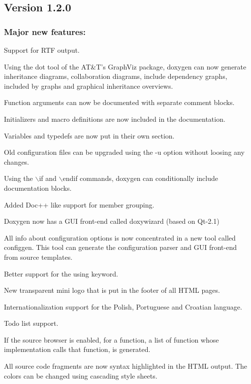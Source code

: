 \subsection*{Version 1.2.0}

\subsubsection*{Major new features:}


\begin{DoxyItemize}
\item Support for RTF output. 
\item Using the dot tool of the AT\&T's GraphViz package, doxygen can now generate inheritance diagrams, collaboration diagrams, include dependency graphs, included by graphs and graphical inheritance overviews. 
\item Function arguments can now be documented with separate comment blocks. 
\item Initializers and macro definitions are now included in the documentation. 
\item Variables and typedefs are now put in their own section. 
\item Old configuration files can be upgraded using the -\/u option without loosing any changes. 
\item Using the $\backslash$if and $\backslash$endif commands, doxygen can conditionally include documentation blocks. 
\item Added Doc++ like support for member grouping. 
\item Doxygen now has a GUI front-\/end called doxywizard (based on Qt-\/2.1) 
\item All info about configuration options is now concentrated in a new tool called configgen. This tool can generate the configuration parser and GUI front-\/end from source templates. 
\item Better support for the using keyword. 
\item New transparent mini logo that is put in the footer of all HTML pages. 
\item Internationalization support for the Polish, Portuguese and Croatian language. 
\item Todo list support. 
\item If the source browser is enabled, for a function, a list of function whose implementation calls that function, is generated. 
\item All source code fragments are now syntax highlighted in the HTML output. The colors can be changed using cascading style sheets. 
\end{DoxyItemize}

